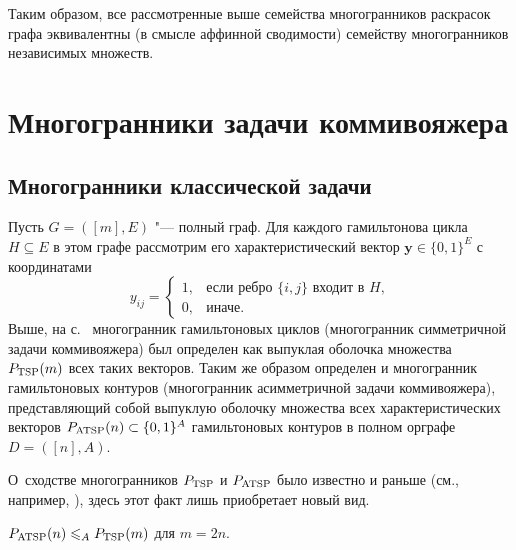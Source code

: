 Таким образом, все рассмотренные выше семейства многогранников раскрасок графа эквивалентны (в смысле аффинной сводимости) семейству многогранников независимых множеств.



%
%

\section{Многогранники задачи коммивояжера}
\label{sec:TravellingAll}

\subsection{Многогранники классической задачи}
\label{sec:Travelling}

Пусть $G = ([m],E)$ "--- полный граф. Для каждого гамильтонова цикла $H \subseteq E$ в этом графе рассмотрим его характеристический вектор $\bm{y} \in \{0,1\}^E$ с координатами
\[
y_{ij} = \begin{cases}
1,& \text{если ребро $\{i,j\}$ входит в $H$,}\\
0,& \text{иначе.}
\end{cases}
\]
Выше, на с.~\pageref{def:TSP} многогранник гамильтоновых циклов (многогранник симметричной задачи коммивояжера) был определен как выпуклая оболочка множества $P_{\textup{TSP}}(m)$ всех таких векторов.
Таким же образом определен и многогранник гамильтоновых контуров (многогранник асимметричной задачи коммивояжера), представляющий собой выпуклую оболочку множества всех характеристических векторов $P_{\textup{ATSP}}(n) \subset \{0,1\}^A$ гамильтоновых контуров в полном орграфе $D = ([n],A)$.

О~сходстве многогранников $P_{\textup{TSP}}$ и $P_{\textup{ATSP}}$ было известно и раньше
(см., например, \cite{Junger:1995TSP, BondBook:1995}), здесь этот факт лишь приобретает новый вид. 

\begin{lemma}
\label{lem:ATSP2TSP}
$P_{\textup{ATSP}}(n) \leqslant_A P_{\textup{TSP}}(m)$ для $m=2n$.
\end{lemma}

